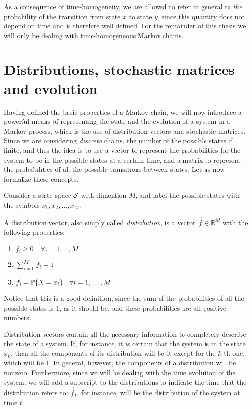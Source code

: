 As a consequence of time-homogeneity, we are allowed to refer in general to \emph{the} probability of the transition from state $x$ to state $y$, since this quantity does not depend on time and is therefore well defined. For the remainder of this thesis we will only be dealing with time-homogeneous Markov chains.

\section{Distributions, stochastic matrices and evolution}
Having defined the basic properties of a Markov chain, we will now introduce a powerful means of representing the state and the evolution of a system in a Markov process, which is the use of distribution vectors and stochastic matrices. Since we are considering \emph{discrete} chains, the number of the possible states if finite, and thus the idea is to use a vector to represent the probabilities for the system to be in the possible states at a certain time, and a matrix to represent the probabilities of all the possible transitions between states. Let us now formalize these concepts.

\smallskip
Consider a state space $\mathcal{S}$ with dimention $M$, and label the possible states with the symbols $x_1, x_2, \dots, x_M$.

\begin{ndef} \label{def:distribution}
    A distribution vector, also simply called \emph{distribution}, is a vector $\vec{f} \in \mathbb{R}^M$ with the following properties:
    \begin{center}
        \begin{enumerate}
            \item $f_i \geq 0 \quad \forall i = 1,\dots, M$
            \item $\sum_{i=0}^M f_i = 1$
            \item $f_i = \mathbb{P}\{X = x_i\} \quad \forall i = 1,\dots, M$
        \end{enumerate}
    \end{center}
    Notice that this is a good definition, since the sum of the probabilities of all the possible states is 1, as it should be, and these probabilities are all positive numbers.
\end{ndef}

Distribution vectors contain all the necessary information to completely describe the state of a system. If, for instance, it is certain that the system is in the state $x_k$, then all the components of its distribution will be 0, except for the $k$-th one, which will be 1. In general, however, the components of a distribution will be nonzero.
Furthermore, since we will be dealing with the time evolution of the system, we will add a subscript to the distributions to indicate the time that the distribution refers to: $\vec{f}_t$, for instance, will be the distribution of the system at time $t$.

